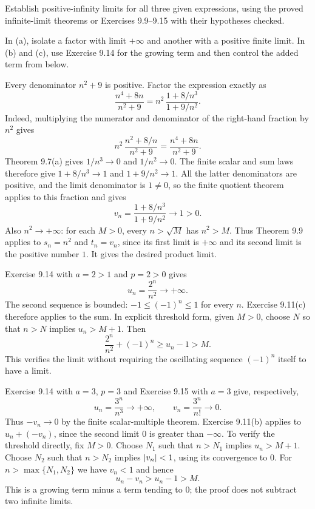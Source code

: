 
\goal Establish positive-infinity limits for all three given
expressions, using the proved infinite-limit theorems or
Exercises 9.9--9.15 with their hypotheses checked.

\idea In (a), isolate a factor with limit $+\infty$ and
another with a positive finite limit. In (b) and (c), use
Exercise 9.14 for the growing term and then control the
added term from below.

Every denominator $n^2+9$ is positive. Factor the expression
exactly as
\[
 \frac{n^4+8n}{n^2+9}
 =n^2\,\frac{1+8/n^3}{1+9/n^2}.
\]
Indeed, multiplying the numerator and denominator of the
right-hand fraction by $n^2$ gives
\[
 n^2\,\frac{n^2+8/n}{n^2+9}
 =\frac{n^4+8n}{n^2+9}.
\]
Theorem 9.7(a) gives $1/n^3\to0$ and $1/n^2\to0$.
The finite scalar and sum laws therefore give
$1+8/n^3\to1$ and $1+9/n^2\to1$.
All the latter denominators are positive, and the limit
denominator is $1\ne0$, so the finite quotient theorem
applies to this fraction and gives
\[
 v_n=\frac{1+8/n^3}{1+9/n^2}\longrightarrow1>0.
\]
Also $n^2\to+\infty$: for each $M>0$, every
$n>\sqrt M$ has $n^2>M$. Thus Theorem 9.9 applies to
$s_n=n^2$ and $t_n=v_n$, since its first limit is
$+\infty$ and its second limit is the positive number $1$.
It gives the desired product limit.


Exercise 9.14 with $a=2>1$ and $p=2>0$ gives
\[
 u_n=\frac{2^n}{n^2}\longrightarrow+\infty.
\]
The second sequence is bounded: $-1\leq(-1)^n\leq1$
for every $n$. Exercise 9.11(c) therefore applies to the
sum. In explicit threshold form, given $M>0$, choose $N$
so that $n>N$ implies $u_n>M+1$. Then
\[
 \frac{2^n}{n^2}+(-1)^n\geq u_n-1>M.
\]
This verifies the limit without requiring the oscillating
sequence $(-1)^n$ itself to have a limit.


Exercise 9.14 with $a=3$, $p=3$ and Exercise 9.15 with
$a=3$ give, respectively,
\[
 u_n=\frac{3^n}{n^3}\longrightarrow+\infty,
 \qquad
 v_n=\frac{3^n}{n!}\longrightarrow0.
\]
Thus $-v_n\to0$ by the finite scalar-multiple theorem.
Exercise 9.11(b) applies to $u_n+(-v_n)$, since the second
limit $0$ is greater than $-\infty$.
To verify the threshold directly, fix $M>0$.
Choose $N_1$ such that $n>N_1$ implies $u_n>M+1$.
Choose $N_2$ such that $n>N_2$ implies
$\left|v_n\right|<1$, using its convergence to $0$.
For $n>\max\{N_1,N_2\}$ we have $v_n<1$ and hence
\[
 u_n-v_n>u_n-1>M.
\]
This is a growing term minus a term tending to $0$;
the proof does not subtract two infinite limits.

